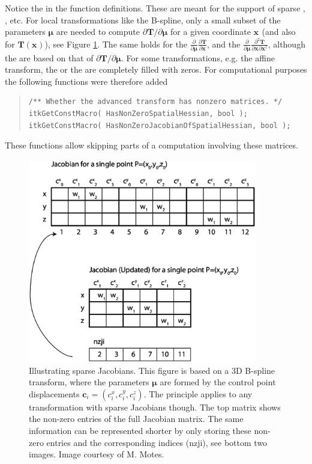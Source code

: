 \documentclass{InsightArticle}
\newcommand{\vT}{\bm{T}}
\newcommand{\vmu}{\bm{\mu}}
\newcommand{\vx}[1][]{\bm{x}_{#1}}
\newcommand{\D}[2]{\frac{\partial #1}{\partial #2}}
\newcommand{\Dinl}[2]{\partial #1 / \partial #2}
\newcommand{\Dd}[3]{\frac{\partial^2 #1}{\partial #2 \partial #3}}
\newcommand{\trp}{^{\dagger}}
\begin{document}
Notice the  in the function
definitions. These are meant for the support of sparse
, , etc. For local
transformations like the B-spline, only a small subset of the
parameters $\vmu$ are needed to compute $\Dinl{\vT}{\vmu}$ for a
given coordinate $\vx$ (and also for $\vT(\vx)$), see Figure
\ref{fig:sparsejac}. The same holds for the
 $\D{}{\vmu} \D{\vT}{\vx}$, and the
 $\D{}{\vmu} \Dd{\vT}{\vx}{\vx\trp}$,
although the  are based on that of
$\Dinl{\vT}{\vmu}$. For some transformations, e.g. the affine
transform, the  or the
 are completely filled with zeros.
For computational purposes the following functions were therefore
added
\begin{quote}
\begin{verbatim}
/** Whether the advanced transform has nonzero matrices. */
itkGetConstMacro( HasNonZeroSpatialHessian, bool );
itkGetConstMacro( HasNonZeroJacobianOfSpatialHessian, bool );
\end{verbatim}
\end{quote}
These functions allow skipping parts of a computation involving
these matrices.

\begin{figure}[tb]
\centering
\includegraphics[width=10cm]{images/jacobian.eps}
\caption{Illustrating sparse Jacobians. This figure is based on a 3D
B-spline transform, where the parameters $\vmu$ are formed by the
control point displacements $\bm{c}_i = (c_i^x, c_i^y, c_i^z)$. The
principle applies to any transformation with sparse Jacobians
though. The top matrix shows the non-zero entries of the full
Jacobian matrix. The same information can be represented shorter by
only storing these non-zero entries and the corresponding indices
(nzji), see bottom two images. Image courtesy of M. Motes.}
\label{fig:sparsejac}
\end{figure}
\end{document}
